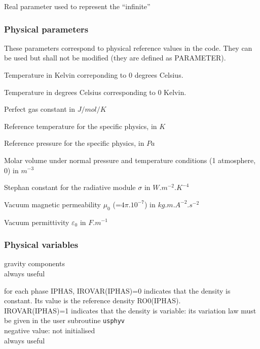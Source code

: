 {Real parameter used to represent the ``infinite''}

\subsubsection{Physical parameters}
These parameters correspond to physical reference values in the code.
They can be used but shall not be modified (they are defined as PARAMETER).

{Temperature in Kelvin correponding to 0 degrees Celsius.}

{Temperature in degrees Celsius corresponding to 0 Kelvin.}

{Perfect gas constant in $J/mol/K$}

{Reference temperature for the specific physics, in $K$}

{Reference pressure for the specific physics, in $Pa$}

{Molar volume under normal pressure and temperature conditions (1 atmosphere,
0\degresC) in $m^{-3}$}

{Stephan constant for the radiative module $\sigma$ in $W.m^{-2}.K^{-4}$}

{Vacuum magnetic permeability $\mu_0$ (=$4\pi.10^{-7}$) in $kg.m.A^{-2}.s^{-2}$}

{Vacuum permittivity $\varepsilon_0$ in $F.m^{-1}$}



\subsubsection{Physical variables}

{gravity components\\
always useful }

{for each phase IPHAS, IROVAR(IPHAS)=0 indicates that the density is
constant. Its value is the reference density RO0(IPHAS).\\
IROVAR(IPHAS)=1 indicates that the density is variable: its variation
law must be given in the user subroutine \texttt{usphyv}\\
negative value: not initialised\\
always useful}

